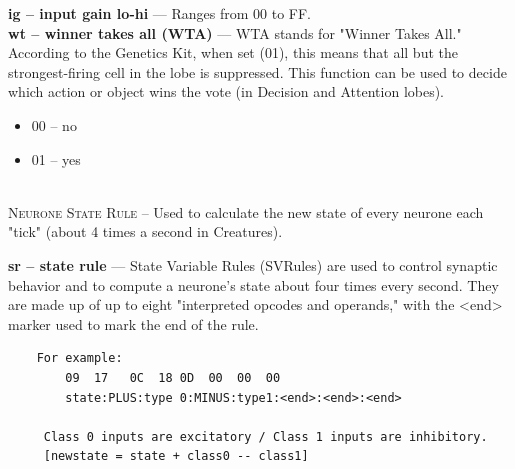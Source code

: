 \documentclass[11pt,twoside,a4paper]{article}
\begin{document}
\textbf{ig -- input gain lo-hi} ---	Ranges from 00 to FF. ~\\

\textbf{wt -- winner takes all (WTA)} --- WTA stands for "Winner Takes All." According to the Genetics Kit, when set (01), this means that all but the strongest-firing cell in the lobe is suppressed. This function can be used to decide which action or object wins the vote (in Decision and Attention lobes).
\begin{itemize}
	\item 00 -- no
	\item 01 -- yes
\end{itemize} ~\\

\textsc{Neurone State Rule} -- Used to calculate the new state of every neurone each "tick" (about 4 times a second in Creatures).

\textbf{sr -- state rule} --- State Variable Rules (SVRules) are used to control synaptic behavior and to compute a neurone's state about four times every second. They are made up of up to eight "interpreted opcodes and operands," with the <end> marker used to mark the end of the rule.

\begin{verbatim}
	For example:
		09	17   0C	 18	0D	00	00	00
		state:PLUS:type 0:MINUS:type1:<end>:<end>:<end>

	 Class 0 inputs are excitatory / Class 1 inputs are inhibitory.
	 [newstate = state + class0 -- class1]
\end{verbatim}

\clearpage
\end{document}
